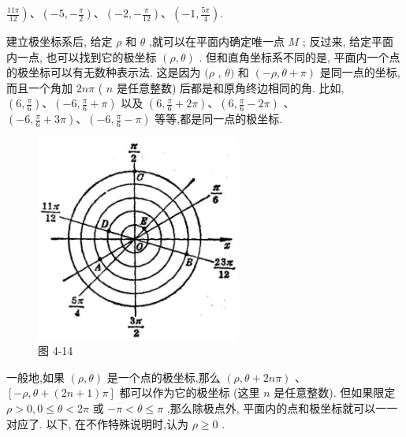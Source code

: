 \documentclass[lang=cn,newtx,10pt,scheme=chinese]{elegantbook}
\begin{document}
\(\left. \frac{11\pi }{12}\right) \text{、}\left( {-5, - \frac{\pi }{2}}\right) \text{、}\left( {-2, - \frac{\pi }{12}}\right) \text{、}\left( {-1,\frac{5\pi }{4}}\right) .\)

建立极坐标系后, 给定 \(\rho\) 和 \(\theta\) ,就可以在平面内确定唯一点 \(M\) ; 反过来, 给定平面内一点, 也可以找到它的极坐标 \(\left( {\rho ,\theta }\right)\) . 但和直角坐标系不同的是, 平面内一个点的极坐标可以有无数种表示法. 这是因为 \((\rho\) , \(\theta )\) 和 \(\left( {-\rho ,\theta + \pi }\right)\) 是同一点的坐标, 而且一个角加 \({2n\pi }\) ( \(n\) 是任意整数) 后都是和原角终边相同的角. 比如, \(\left( {6,\frac{\pi }{6}}\right) \text{、}\left( {-6,\frac{\pi }{6} + \pi }\right)\) 以及 \(\left( {6,\frac{\pi }{6} + {2\pi }}\right) \text{、}\left( {6,\frac{\pi }{6} - {2\pi }}\right)\) 、 \(\left( {-6,\frac{\pi }{6} + {3\pi }}\right) \text{、}\left( {-6,\frac{\pi }{6} - \pi }\right)\) 等等,都是同一点的极坐标.

\begin{figure}[h]
  \centering
  \includegraphics[max width=0.6\textwidth]{images/01912cc2-ffb6-728e-9ae7-b113ff05c64b_175_124693.jpg}
  \caption{图 4-14}
\end{figure}



一般地,如果 \(\left( {\rho ,\theta }\right)\) 是一个点的极坐标,那么 \(\left( {\rho ,\theta + {2n\pi }}\right)\) 、 \(\left\lbrack {-\rho ,\theta + \left( {{2n} + 1}\right) \pi }\right\rbrack\) 都可以作为它的极坐标 (这里 \(n\) 是任意整数). 但如果限定 \(\rho > 0,0 \leq \theta < {2\pi }\) 或 \(- \pi < \theta \leq \pi\) ,那么除极点外, 平面内的点和极坐标就可以一一对应了. 以下, 在不作特殊说明时,认为 \(\rho \geq 0\) .
\end{document}
